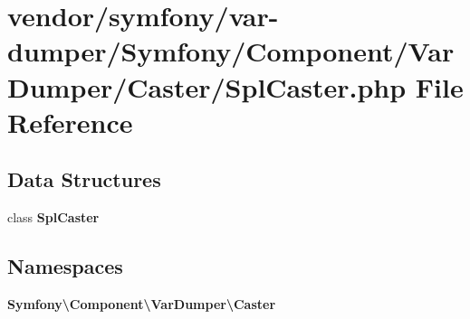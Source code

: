 \section{vendor/symfony/var-\/dumper/\+Symfony/\+Component/\+Var\+Dumper/\+Caster/\+Spl\+Caster.php File Reference}
\label{_spl_caster_8php}
\subsection*{Data Structures}
\begin{DoxyCompactItemize}
\item 
class {\bf Spl\+Caster}
\end{DoxyCompactItemize}
\subsection*{Namespaces}
\begin{DoxyCompactItemize}
\item 
 {\bf Symfony\textbackslash{}\+Component\textbackslash{}\+Var\+Dumper\textbackslash{}\+Caster}
\end{DoxyCompactItemize}
